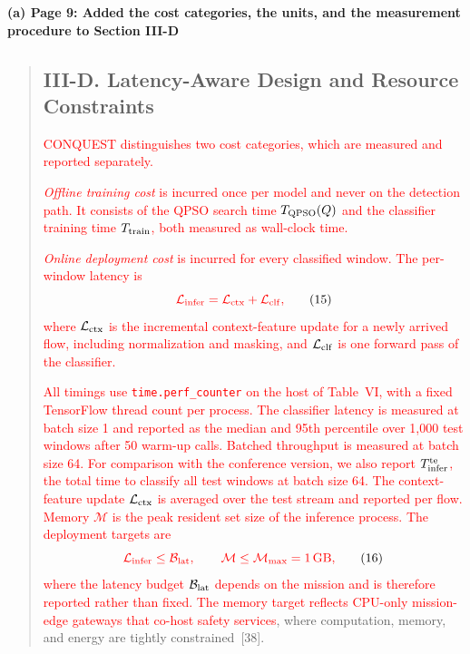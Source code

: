 \documentclass[11pt]{article}
\newenvironment{excerpt}{\begin{quote}\sloppy}{\end{quote}}
\newcommand{\mshead}[2]{\subsection*{\textbf{#1. #2}}}
\newcommand{\loc}[1]{\par\medskip\noindent\textbf{#1}\par}
\begin{document}
\loc{(a) Page 9: Added the cost categories, the units, and the measurement procedure to Section III-D}
\begin{excerpt}
\mshead{III-D}{Latency-Aware Design and Resource Constraints}


\textcolor{red}{CONQUEST distinguishes two cost
categories, which are measured and reported separately.}

\textcolor{black}{\textcolor{red}{\textit{Offline training cost} is incurred
once per model and never on the detection path. It consists of the
QPSO search time $T_{\rm QPSO}(Q)$ and the classifier training time
$T_{\rm train}$, both measured as wall-clock time.}}

\textcolor{black}{\textcolor{red}{\textit{Online deployment cost} is incurred
for every classified window. The per-window latency is}}
\begin{equation}
\textcolor{black}{\textcolor{red}{\mathcal{L}_{\rm infer} =
\mathcal{L}_{\rm ctx} + \mathcal{L}_{\rm clf},}}
\tag{15}
\end{equation}
\textcolor{black}{\textcolor{red}{where $\mathcal{L}_{\rm ctx}$ is the
incremental context-feature update for a newly arrived flow,
including normalization and masking, and $\mathcal{L}_{\rm clf}$ is
one forward pass of the classifier.}}

\textcolor{red}{All timings use \texttt{time.perf\_counter}
on the host of Table~VI, with a fixed TensorFlow
thread count per process. The classifier latency is measured at batch
size 1 and reported as the median and 95th percentile over 1{,}000
test windows after 50 warm-up calls. Batched throughput is measured
at batch size 64. For comparison with the conference version, we also
report $T_{\rm infer}^{\rm te}$, the total time to classify all test
windows at batch size 64. The context-feature update
$\mathcal{L}_{\rm ctx}$ is averaged over the test stream and reported
per flow. Memory $\mathcal{M}$ is the peak resident set size of the
inference process. The deployment targets are}
\begin{equation}
\textcolor{red}{\mathcal{L}_{\rm infer}\le\mathcal{B}_{\rm lat},
\qquad
\mathcal{M}\le\mathcal{M}_{\max}=1\,\text{GB},}
\tag{16}
\end{equation}
\textcolor{red}{where the latency budget
$\mathcal{B}_{\rm lat}$ depends on the mission and is therefore
reported rather than fixed. The memory target reflects CPU-only
mission-edge gateways that co-host safety services}, where
computation, memory, and energy are tightly
constrained~{[38]}.
\end{excerpt}
\end{document}
